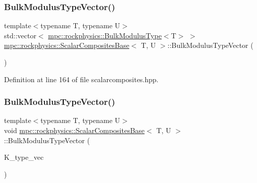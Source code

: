 \subsubsection{\texorpdfstring{Bulk\+Modulus\+Type\+Vector()}{BulkModulusTypeVector()}\hspace{0.1cm}{\footnotesize\ttfamily [1/3]}}
{\footnotesize\ttfamily template$<$typename T, typename U$>$ \\
std\+::vector$<$ \mbox{\hyperlink{structmpc_1_1rockphysics_1_1_bulk_modulus_type}{mpc\+::rockphysics\+::\+Bulk\+Modulus\+Type}}$<$T$>$ $>$ \mbox{\hyperlink{classmpc_1_1rockphysics_1_1_scalar_composites_base}{mpc\+::rockphysics\+::\+Scalar\+Composites\+Base}}$<$ T, U $>$\+::Bulk\+Modulus\+Type\+Vector (\begin{DoxyParamCaption}{ }\end{DoxyParamCaption})\hspace{0.3cm}{\ttfamily [inline]}}



Definition at line 164 of file scalarcomposites.\+hpp.

\mbox{\label{classmpc_1_1rockphysics_1_1_scalar_composites_base_a0f10f7c62c35d9e86247d768305a34c0}} 
\subsubsection{\texorpdfstring{Bulk\+Modulus\+Type\+Vector()}{BulkModulusTypeVector()}\hspace{0.1cm}{\footnotesize\ttfamily [2/3]}}
{\footnotesize\ttfamily template$<$typename T, typename U$>$ \\
void \mbox{\hyperlink{classmpc_1_1rockphysics_1_1_scalar_composites_base}{mpc\+::rockphysics\+::\+Scalar\+Composites\+Base}}$<$ T, U $>$\+::Bulk\+Modulus\+Type\+Vector (\begin{DoxyParamCaption}\item[{std\+::vector$<$ \mbox{\hyperlink{structmpc_1_1rockphysics_1_1_bulk_modulus_type}{mpc\+::rockphysics\+::\+Bulk\+Modulus\+Type}}$<$ T $>$ $>$}]{K\+\_\+type\+\_\+vec }\end{DoxyParamCaption})\hspace{0.3cm}{\ttfamily [inline]}}



